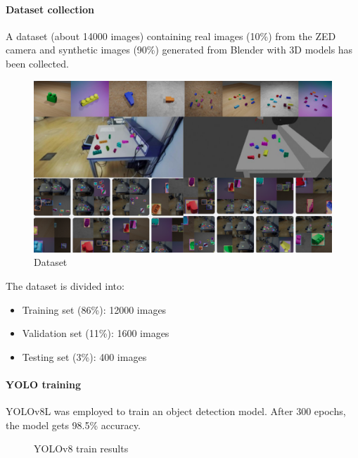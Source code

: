 \documentclass{article}
\begin{document}
	\paragraph{Dataset collection}
	A dataset (about 14000 images) containing real images (10\%) from the ZED camera and synthetic images (90\%) generated from Blender with 3D models has been collected.
	
	\begin{figure}[H]
		\centering
		\includegraphics[width=1.0\textwidth]{images/dataset.png}
		\caption{Dataset}
		\label{fig:dataset}
	\end{figure}
	
	The dataset is divided into:
	\begin{itemize}
		\item Training set (86\%): 12000 images
		\item Validation set (11\%): 1600 images
		\item Testing set (3\%): 400 images
	\end{itemize}
	
	\paragraph{YOLO training}
	YOLOv8L was employed to train an object detection model. After 300 epochs, the model gets 98.5\% accuracy.
	
	\begin{figure}[H]
		\centering
		\caption{YOLOv8 train results}
		\label{fig:train_results}
	\end{figure}
	
\end{document}
